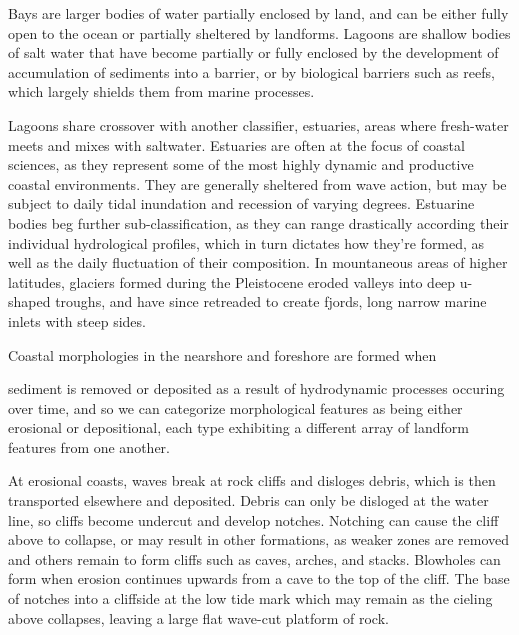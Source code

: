\documentclass{article}
\begin{document}
\par{\noindent Bays are larger bodies of water partially enclosed by land, and can be either fully open to the ocean or partially sheltered by landforms. Lagoons are shallow bodies of salt water that have become partially or fully enclosed by the development of accumulation of sediments into a barrier, or by biological barriers such as reefs, which largely shields them from marine processes. 

\par{Lagoons share crossover with another classifier, estuaries, areas where fresh-water meets and mixes with saltwater. Estuaries are often at the focus of coastal sciences, as they represent some of the most highly dynamic and productive coastal environments. They are generally sheltered from wave action, but may be subject to daily tidal inundation and recession of varying degrees. Estuarine bodies beg further sub-classification, as they can range drastically according their individual hydrological profiles, which in turn dictates how they're formed, as well as the daily fluctuation of their composition. In mountaneous areas of higher latitudes, glaciers formed during the Pleistocene eroded valleys into deep u-shaped troughs, and have since retreaded to create fjords, long narrow marine inlets with steep sides.}

\par{Coastal morphologies in the nearshore and foreshore are formed when}

\newpage
{}
\fancyfoot[C]{\thepage} 
\thispagestyle{fancy}

\par{sediment is removed or deposited as a result of hydrodynamic processes occuring over time, and so we can categorize morphological features as being either erosional or depositional, each type exhibiting a different array of landform features from one another.}

\par{At erosional coasts, waves break at rock cliffs and disloges debris, which is then transported elsewhere and deposited. Debris can only be disloged at the water line, so cliffs become undercut and develop notches. Notching can cause the cliff above to collapse, or may result in other formations, as weaker zones are removed and others remain to form cliffs such as caves, arches, and stacks. Blowholes can form when erosion continues upwards from a cave to the top of the cliff. The base of notches into a cliffside at the low tide mark which may remain as the cieling above collapses, leaving a large flat wave-cut platform of rock.}

}
\end{document}
